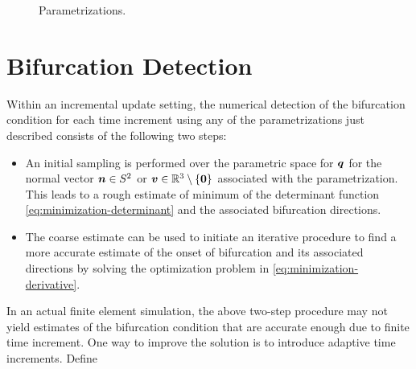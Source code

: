 \documentclass[12pt]{article}
\numberwithin{equation}{section}
\begin{document}
\begin{figure}[htbp]
\begin{center}
{      \label{fig:tangent}
    }
    \caption{Parametrizations.}
    \label{fig:parametrizations}
  \end{center}
\end{figure}

\section{Bifurcation Detection}
\label{sec:detection}

Within an incremental update setting, the numerical detection of the bifurcation condition for each time increment using any of the parametrizations just described consists of the following two steps:

\begin{itemize}
  
\item An initial sampling is performed over the 
parametric space for ${\boldsymbol{q}}$ for the normal vector ${\boldsymbol{n}} \in S^2$ or ${\boldsymbol{v}} 
\in \mathbb{R}^3 \setminus \{\mathbf{0}\}$ associated with the 
parametrization. This leads to a rough estimate of minimum of the 
determinant function \eqref{eq:minimization-determinant} and the 
associated bifurcation directions.
  
\item The coarse estimate can be used to initiate an iterative 
procedure to find a more accurate estimate of the onset of bifurcation 
and its associated directions by solving the optimization problem in \eqref{eq:minimization-derivative}. 

\end{itemize}

In an actual finite element simulation, the above two-step procedure 
may not yield estimates of the bifurcation condition that are accurate 
enough due to finite time increment. One way to improve the solution 
is to introduce adaptive time increments. Define
\end{document}
